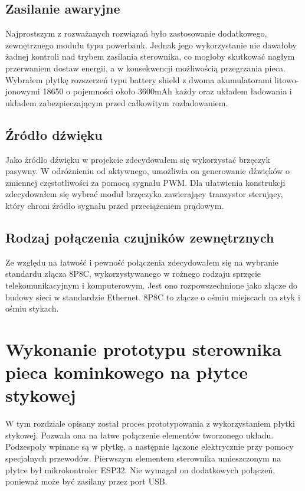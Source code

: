 \documentclass[11pt]{report}
\begin{document}
 \section{Zasilanie awaryjne}
 Najprostszym z rozważanych rozwiązań było zastosowanie dodatkowego, zewnętrznego modułu typu powerbank. Jednak jego wykorzystanie nie dawałoby żadnej kontroli nad trybem zasilania sterownika, co mogłoby skutkować nagłym przerwaniem dostaw energii, a w konsekwencji możliwością przegrzania pieca. Wybrałem płytkę rozszerzeń typu battery shield z dwoma akumulatorami litowo-jonowymi 18650 o pojemności około 3600mAh każdy oraz układem ładowania i układem zabezpieczającym przed całkowitym rozładowaniem.
 
 \section{Źródło dźwięku}
 Jako źródło dźwięku w projekcie zdecydowałem się wykorzystać brzęczyk pasywny. W odróżnieniu od aktywnego, umożliwia on generowanie dźwięków o zmiennej częstotliwości za pomocą sygnału PWM. Dla ułatwienia konstrukcji zdecydowałem się wybrać moduł brzęczyka zawierający tranzystor sterujący, który chroni źródło sygnału przed przeciążeniem prądowym.
 
 \section{Rodzaj połączenia czujników zewnętrznych}
 Ze względu na łatwość i pewność połączenia zdecydowałem się na wybranie standardu złącza 8P8C, wykorzystywanego w rożnego rodzaju sprzęcie telekomunikacyjnym i komputerowym. Jest ono rozpowszechnione jako złącze do budowy sieci w standardzie Ethernet. 8P8C to złącze o ośmiu miejscach na styk i ośmiu stykach.
 
 
 \chapter{Wykonanie prototypu sterownika pieca kominkowego na płytce stykowej}\label{ch:prototyp:stykowa}
 W tym rozdziale opisany został proces prototypowania z wykorzystaniem płytki stykowej.
 Pozwala ona na łatwe połączenie elementów tworzonego układu. Podzespoły wpinane są w płytkę, a następnie łączone elektrycznie przy pomocy specjalnych przewodów.
 Pierwszym elementem sterownika umieszczonym na płytce był mikrokontroler ESP32. Nie wymagał on dodatkowych połączeń, ponieważ może być zasilany przez port USB.
  
\end{document}
